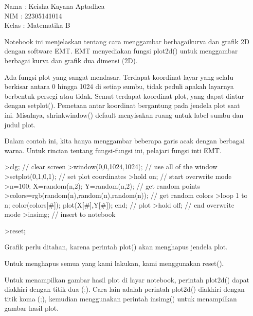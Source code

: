 \documentclass{article}
\begin{document}
\begin{eulernotebook}
\begin{eulercomment}
Nama  : Keisha Kayana Aptadhea\\
NIM   : 22305141014\\
Kelas : Matematika B

\begin{eulercomment}
\begin{eulercomment}
Notebook ini menjelaskan tentang cara menggambar berbagaikurva dan
grafik 2D dengan software EMT. EMT menyediakan fungsi plot2d() untuk
menggambar berbagai kurva dan grafik dua dimensi (2D).

\end{eulercomment}
\begin{eulercomment}
Ada fungsi plot yang sangat mendasar. Terdapat koordinat layar yang
selalu berkisar antara 0 hingga 1024 di setiap sumbu, tidak peduli
apakah layarnya berbentuk persegi atau tidak. Semut terdapat koordinat
plot, yang dapat diatur dengan setplot(). Pemetaan antar koordinat
bergantung pada jendela plot saat ini. Misalnya, shrinkwindow()
default menyisakan ruang untuk label sumbu dan judul plot.

Dalam contoh ini, kita hanya menggambar beberapa garis acak dengan
berbagai warna. Untuk rincian tentang fungsi-fungsi ini, pelajari
fungsi inti EMT.
\end{eulercomment}
\begin{eulerprompt}
>clg; // clear screen
>window(0,0,1024,1024); // use all of the window
>setplot(0,1,0,1); // set plot coordinates
>hold on; // start overwrite mode
>n=100; X=random(n,2); Y=random(n,2);  // get random points
>colors=rgb(random(n),random(n),random(n)); // get random colors
>loop 1 to n; color(colors[#]); plot(X[#],Y[#]); end; // plot
>hold off; // end overwrite mode
>insimg; // insert to notebook
\end{eulerprompt}
\begin{eulerprompt}
>reset;
\end{eulerprompt}
\begin{eulercomment}
Grafik perlu ditahan, karena perintah plot() akan menghapus jendela
plot.

Untuk menghapus semua yang kami lakukan, kami menggunakan reset().

Untuk menampilkan gambar hasil plot di layar notebook, perintah
plot2d() dapat diakhiri dengan titik dua (:). Cara lain adalah
perintah plot2d() diakhiri dengan titik koma (;), kemudian menggunakan
perintah insimg() untuk menampilkan gambar hasil plot.


\end{eulercomment}
\end{eulercomment}
\end{eulercomment}
\end{eulernotebook}
\end{document}
